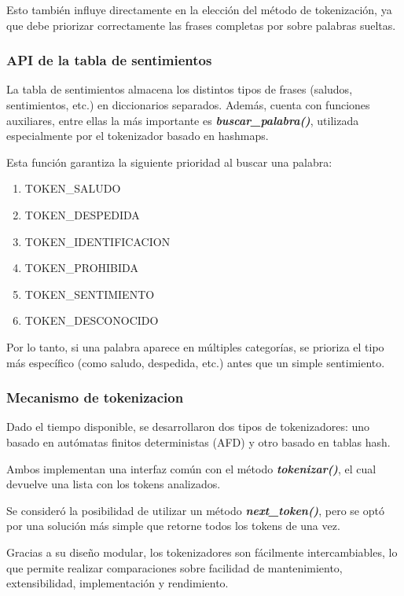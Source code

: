 Esto también influye directamente en la elección del método de tokenización, ya que debe
priorizar correctamente las frases completas por sobre palabras sueltas.

\subsubsection{API de la tabla de sentimientos}
La tabla de sentimientos almacena los distintos tipos de frases (saludos, sentimientos, etc.)
en diccionarios separados. Además, cuenta con funciones auxiliares, entre ellas la más
importante es \textbf{\textit{buscar\_palabra()}}, utilizada especialmente por el tokenizador
basado en hashmaps.

Esta función garantiza la siguiente prioridad al buscar una palabra:

\begin{enumerate}
	\item \footnotesize{TOKEN\_SALUDO}
	\item \footnotesize{TOKEN\_DESPEDIDA}
	\item \footnotesize{TOKEN\_IDENTIFICACION}
	\item \footnotesize{TOKEN\_PROHIBIDA}
	\item \footnotesize{TOKEN\_SENTIMIENTO}
	\item \footnotesize{TOKEN\_DESCONOCIDO}
\end{enumerate}

Por lo tanto, si una palabra aparece en múltiples categorías, se prioriza el tipo más
específico (como saludo, despedida, etc.) antes que un simple sentimiento.

\subsubsection{Mecanismo de tokenizacion}
Dado el tiempo disponible, se desarrollaron dos tipos de tokenizadores: uno basado en autómatas
finitos deterministas (AFD) y otro basado en tablas hash.

Ambos implementan una interfaz común con el método \textbf{\textit{tokenizar()}}, el cual
devuelve una lista con los tokens analizados.

Se consideró la posibilidad de utilizar un método \textbf{\textit{next\_token()}}, pero se optó
por una solución más simple que retorne todos los tokens de una vez.

Gracias a su diseño modular, los tokenizadores son fácilmente intercambiables, lo que permite
realizar comparaciones sobre facilidad de mantenimiento, extensibilidad, implementación y
rendimiento.

